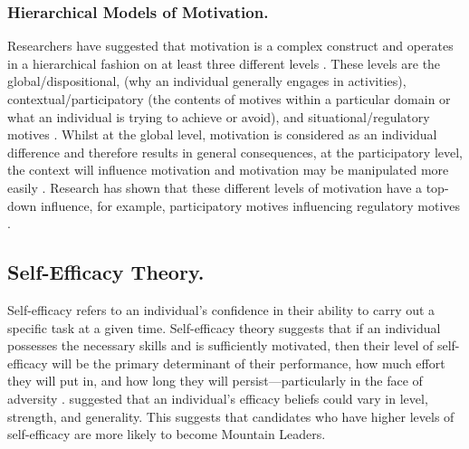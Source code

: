 \documentclass[
  12pt,
  a4paper,
]{book}
\begin{document}
\hypertarget{hierarchical-models-of-motivation.}{%
\subsubsection{Hierarchical Models of Motivation.}\label{hierarchical-models-of-motivation.}}

Researchers have suggested that motivation is a complex construct and operates in a hierarchical fashion on at least three different levels \citep{Ingledew2009, Vallerand1997, Vallerand2002}. These levels are the global/dispositional, (why an individual generally engages in activities), contextual/participatory (the contents of motives within a particular domain or what an individual is trying to achieve or avoid), and situational/regulatory motives \citep[the perceived locus of causality of the behavioural goals---where the motive sits on the relative autonomy continuum;][]{Deci2000, Ingledew2009, Vallerand1997, Vallerand2002}. Whilst at the global level, motivation is considered as an individual difference and therefore results in general consequences, at the participatory level, the context will influence motivation and motivation may be manipulated more easily \citep{Vallerand2002}. \citet{Ingledew2009} Research has shown that these different levels of motivation have a top-down influence, for example, participatory motives influencing regulatory motives \citep{Ingledew2009}.

\hypertarget{gen-intro-self-efficacy}{%
\subsection{Self-Efficacy Theory.}\label{gen-intro-self-efficacy}}

Self-efficacy refers to an individual's confidence in their ability to carry out a specific task at a given time. Self-efficacy theory suggests that if an individual possesses the necessary skills and is sufficiently motivated, then their level of self-efficacy will be the primary determinant of their performance, how much effort they will put in, and how long they will persist---particularly in the face of adversity \citep{Bandura1977, Bandura1982, Bandura1997}. \citet{Bandura1977} suggested that an individual's efficacy beliefs could vary in level, strength, and generality. This suggests that candidates who have higher levels of self-efficacy are more likely to become Mountain Leaders.
\end{document}
